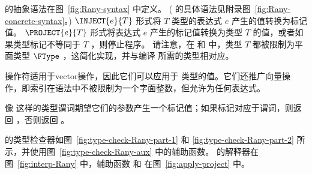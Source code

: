 \documentclass[11pt]{book}
\begin{document}
 \LangAny{} 的抽象语法在图~\ref{fig:Rany-syntax} 中定义。
( \LangAny{} 的具体语法见附录图~\ref{fig:Rany-concrete-syntax}。)  $\INJECT{e}{T}$ 形式将 $T$ 类型的表达式 $e$ 产生的值转换为标记值。 $\PROJECT{e}{T}$ 形式将表达式 $e$ 产生的标记值转换为类型 $T$ 的值，或者如果类型标记不等同于 $T$ ，则停止程序。
%
请注意，在  和  中，类型 $T$ 都被限制为平面类型 $\FType$ ，这简化实现，并与编译 \LangDyn{} 所需的类型相对应。

  操作符适用于vector操作，因此它们可以应用于  类型的值。它们还推广向量操作，即索引在语法中不被限制为一个字面整数，但允许为任何表达式。

像  这样的类型谓词期望它们的参数产生一个标记值；如果标记对应于谓词，则返回  ，否则返回  。

 \LangAny{} 的类型检查器如图~\ref{fig:type-check-Rany-part-1} 和
\ref{fig:type-check-Rany-part-2} 所示，并使用图~\ref{fig:type-check-Rany-aux} 中的辅助函数。
%
 \LangAny{} 的解释器在图~\ref{fig:interp-Rany} 中，辅助函数  和  在图~\ref{fig:apply-project} 中。
\end{document}
